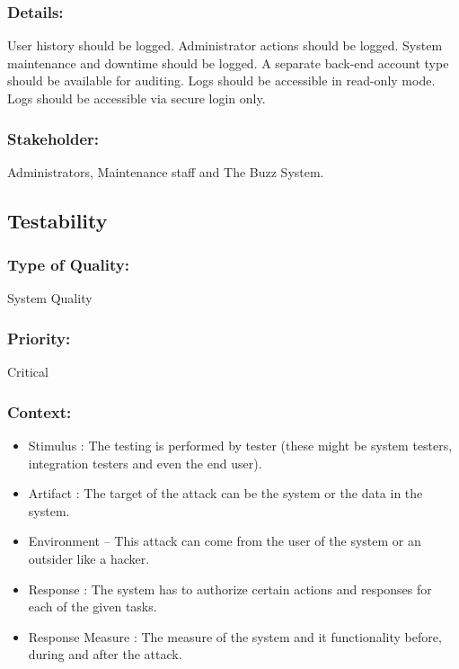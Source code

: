 \documentclass[11pt]{article}
\begin{document}
		\subsubsection{Details:}
			\textbf{}User history should be logged. Administrator actions should be logged. System maintenance and downtime should be logged. A separate back-end account type should be available for auditing. Logs should be accessible in read-only mode. Logs should be accessible via secure login only.
		
		\subsubsection{Stakeholder:}
			\textbf{}Administrators, Maintenance staff and The Buzz System.
	
	\subsection{Testability}
	
		\subsubsection{Type of Quality:}
			\textbf{} System Quality
		
		\subsubsection{Priority:}
			\textbf{} Critical

		\subsubsection{Context:}
		\begin{itemize}
			\item Stimulus : The testing is performed by tester (these might be system testers, integration testers and even the end user).
			\item Artifact : The target of the attack can be the system or the data in the system.
			\item Environment – This attack can come from the user of the system or an outsider like a hacker. 
			\item Response : The system has to authorize certain actions and responses for each of the given tasks.
			\item Response Measure : The measure of the system and it functionality before, during and after the attack.
		\end{itemize}
		
\end{document}
